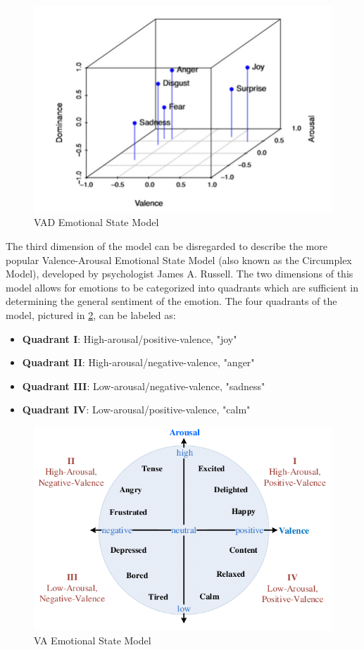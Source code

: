 \documentclass[11pt]{article}
\begin{document}
\begin{figure}[!ht]
  \includegraphics[scale=0.35]{../statics/vad_.png}
  \centering
  \caption{VAD Emotional State Model}
  \label{fig:vad}
\end{figure}

The third dimension of the model can be disregarded to describe the more popular Valence-Arousal Emotional State Model (also known as the Circumplex Model), developed by psychologist James A. Russell. The two dimensions of this model allows for emotions to be categorized into quadrants which are sufficient in determining the general sentiment of the emotion. The four quadrants of the model, pictured in \ref{fig:va}, can be labeled as:
\begin{itemize}
  \item \textbf{Quadrant I}: High-arousal/positive-valence, "joy"
  \item \textbf{Quadrant II}: High-arousal/negative-valence, "anger"
  \item \textbf{Quadrant III}: Low-arousal/negative-valence, "sadness"
  \item \textbf{Quadrant IV}: Low-arousal/positive-valence, "calm"
\end{itemize}

\begin{figure}[!ht]
  \includegraphics[scale=0.45]{../statics/va_.png}
  \centering
  \caption{VA Emotional State Model}
  \label{fig:va}
\end{figure}
\end{document}
